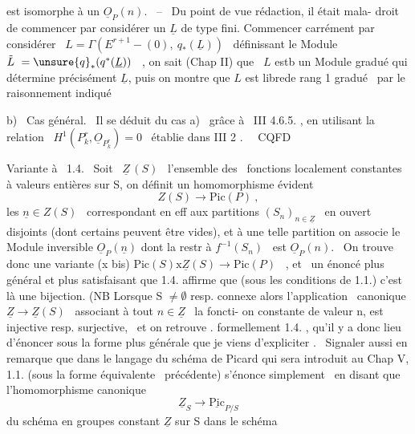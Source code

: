 
est isomorphe à un $\underline{O}_P(n)$. \ -- \ Du point de vue rédaction, il était mala-%
droit de commencer par considérer un $\underline{L}$ de type fini. Commencer carrément
par considérer \ $L = \Gamma(E^{r+1}-(0),\ q_*(\underline{L}))$ \ définissant le Module
$\tilde{L} \ = \unsure{q}_*(q^*(\underline{L}))$ \ , on sait (Chap II) que \ $L$ estb un Module gradué qui
détermine précisément $\underline{L}$, puis on montre que $L$ est librede rang 1 
gradué \ par le raisonnement indiqué\hand{:}

b) \ Cas général. \ Il se déduit du cas a) \ grâce à \ III 4.6.5. , en
utilisant la relation \ $H^1(P^r_k,\underline{O}_{P^r_k}) = 0$ \ établie dans III 2 . \ \ CQFD

Variante à \ 1.4. \ Soit \ $\underline{Z}\,(S)$ \ l'ensemble des \ fonctions localement
constantes à valeurs entières sur S, on définit un homomorphisme évident
\[ Z(S) \longrightarrow \mathrm{Pic}(P) \ , \]
les  $\underline{n} \in Z(S)$ \ correspondant en eff aux  partitions $(S_n)_{n\in\underline{Z}}$ \ en ouvert
disjoints (dont certains peuvent être vides),  et  à une
telle partition on associe le Module inversible $\underline{O}_P(\underline{n})$ dont la restr à 
$f^{-1}(S_n)$ \ est $\underline{O}_P(n)$. \ On trouve donc une variante
(x bis) \hfill $\mathrm{Pic}(S)\mathrm{x}\underline{Z}(S) \longrightarrow \mathrm{Pic}(P)$ \ , \hfill
et \ un énoncé plus général et plus satisfaisant que 1.4. affirme que
(sous les conditions de 1.1.) c'est là une bijection. (NB Lorsque S $\neq \emptyset$
resp. connexe\hand{)}
alors l'application \ canonique $\underline{Z} \to \underline{Z}(S)$ \ associant à tout $n \in \underline{Z}$ \ la foncti-%
on constante de valeur n, est injective resp. surjective, \ et on retrouve .
formellement 1.4. , qu'il y a donc lieu d'énoncer sous la forme plus
générale que je viens d'expliciter . \ Signaler aussi en remarque que
dans le langage du schéma de Picard qui sera introduit au Chap V, 1.1.
(sous la forme équivalente \ précédente) s'énonce simplement \ en disant que
l'homomorphisme canonique
\[ \underline{Z}_S \longrightarrow \underline{\mathrm{Pic}}_{P/S} \]
du schéma en groupes constant  $\underline{Z}$ sur S dans le schéma

